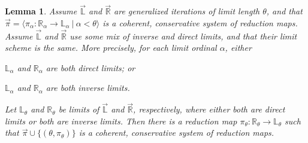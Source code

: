 \documentclass{amsart}
\newtheorem{lemma}[theorem]{Lemma}
\begin{document}
\begin{lemma}\label{lem_WhatToDoAtLimits}
Assume $\vec{\mathbb{L}}$ and $\vec{\mathbb{R}}$ are generalized iterations of limit length $\theta$, and that $\vec{\pi} = \langle \pi_\alpha: \mathbb{R}_\alpha \to \mathbb{L}_\alpha \ | \ \alpha < \theta \rangle$ is a coherent, conservative system of reduction maps.  Assume $\vec{\mathbb{L}}$ and $\vec{\mathbb{R}}$ use some mix of inverse and direct limits, and that their limit scheme is the same.  More precisely, for each limit ordinal $\alpha$, either 
\begin{enumerate*}
 \item $\mathbb{L}_\alpha$ and $\mathbb{R}_\alpha$ are both direct limits; or
 \item $\mathbb{L}_\alpha$ and $\mathbb{R}_\alpha$ are both inverse limits. 
\end{enumerate*}

Let $\mathbb{L}_\theta$ and $\mathbb{R}_\theta$ be limits of $\vec{\mathbb{L}}$ and $\vec{\mathbb{R}}$, respectively, where either both are direct limits or both are inverse limits.  Then there is a reduction map $\pi_\theta: \mathbb{R}_\theta \to \mathbb{L}_\theta$ such that $\vec{\pi} \cup \{( \theta, \pi_\theta ) \}$ is a coherent, conservative system of reduction maps.
\end{lemma}
\end{document}
